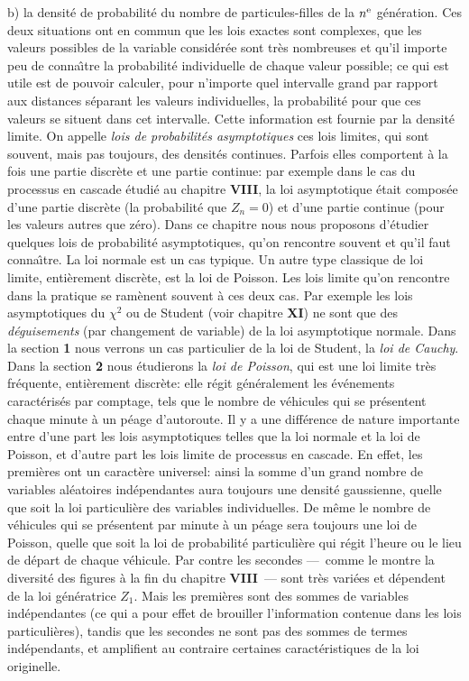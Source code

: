 b) la densit\'e de probabilit\'e du nombre de particules-filles de 
la $n^{\rm e}$ g\'en\'eration.  
\medskip 
Ces deux situations ont en commun que les lois exactes sont complexes, 
que les valeurs possibles de la variable consid\'er\'ee sont tr\`es  
nombreuses et qu'il importe peu de conna{\^\i}tre la probabilit\'e 
individuelle de chaque valeur possible; ce qui est utile est de pouvoir 
calculer, pour n'importe quel intervalle grand par rapport aux distances 
s\'eparant les valeurs individuelles, la probabilit\'e pour que ces valeurs  
se situent dans cet intervalle. Cette information est fournie par la 
densit\'e limite.  
\medskip 
On appelle {\it lois de probabilit\'es asymptotiques} ces lois limites, qui 
sont souvent, mais pas toujours, des densit\'es continues. Parfois elles 
comportent \`a la fois une partie discr\`ete et une partie continue: par 
exemple dans le cas du processus en cascade \'etudi\'e au chapitre {\bf  
VIII}, la loi asymptotique \'etait compos\'ee d'une partie discr\`ete (la 
probabilit\'e que $Z_n=0$) et d'une partie continue (pour les valeurs  
autres que z\'ero).  
\medskip 
Dans ce chapitre nous nous proposons d'\'etudier quelques lois de 
probabilit\'e asymptotiques, qu'on rencontre souvent et qu'il faut 
conna{\^\i}tre. 
\medskip 
La loi normale est un cas 
typique. Un autre type classique de loi limite, enti\`erement  
discr\`ete, est la loi de Poisson. Les lois limite qu'on rencontre dans la 
pratique se ram\`enent souvent \`a ces deux cas. Par  exemple  
les lois asymptotiques du $\chi^2$ ou de Student (voir chapitre {\bf XI})  
ne sont que des {\it d\'eguisements} (par changement de variable) de la  
loi asymptotique normale. Dans la section {\bf 1} nous verrons un cas 
particulier de la loi de Student, la {\it  loi de Cauchy}. Dans la section  
{\bf 2} nous \'etudierons la {\it loi de Poisson}, qui est une loi limite  
tr\`es fr\'equente, enti\`erement discr\`ete: elle r\'egit  g\'en\'eralement  
les \'ev\'enements caract\'eris\'es par comptage, tels que le nombre de 
v\'ehicules qui se pr\'esentent chaque minute \`a un p\'eage d'autoroute. 
\medskip  
Il y a une diff\'erence de nature importante entre d'une part les 
lois asymptotiques telles que la loi normale et la loi de Poisson, et  
d'autre  part les lois limite de processus en cascade. En effet, les 
premi\`eres  ont un caract\`ere universel: ainsi la somme d'un grand 
nombre de variables al\'eatoires ind\'ependantes aura toujours une 
densit\'e  gaussienne, quelle que soit la loi particuli\`ere des variables 
individuelles. De m\^eme  le nombre de v\'ehicules qui se pr\'esentent  
par minute \`a un p\'eage sera toujours une loi de Poisson, quelle que 
soit la loi de probabilit\'e particuli\`ere qui r\'egit l'heure ou le lieu de 
d\'epart  de chaque v\'ehicule.  Par contre les secondes ---~comme le 
montre la diversit\'e des  figures \`a la fin du chapitre {\bf VIII}~---  
sont tr\`es vari\'ees et d\'ependent de la loi g\'en\'eratrice $Z_1$. Mais  
les premi\`eres sont des sommes  de variables ind\'ependantes (ce  
qui  a  pour effet de brouiller l'information contenue dans les lois 
particuli\`eres), tandis  que les secondes ne sont  pas des sommes de 
termes ind\'ependants, et amplifient au contraire certaines 
caract\'eristiques de la loi originelle. 
 
